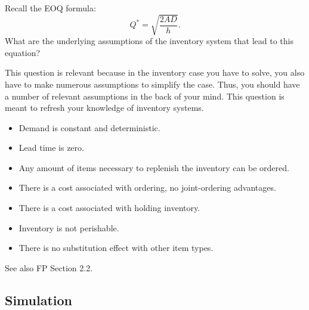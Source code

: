 \begin{exercise}\label{ex:1}
  Recall the EOQ formula:
  \begin{equation*}
    Q^* = \sqrt{\frac{ 2 A D}{h}}.
  \end{equation*}
What are the underlying assumptions of the inventory system that lead to this equation?

This question is relevant because in the inventory case you have to
solve, you also have to make numerous assumptions to simplify the
case. Thus, you should have a number of relevant assumptions in the
back of your mind.  This question is meant to refresh your knowledge
of inventory systems.


\begin{solution}
\begin{itemize}
\item Demand is constant and deterministic.
\item Lead time is zero.
\item Any amount of items necessary to replenish the inventory can be
  ordered.
\item There is a cost associated with ordering, no joint-ordering advantages.
\item There is a cost associated with holding inventory.
\item Inventory is not perishable.
\item There is no substitution effect with other item types.
\end{itemize}
See also FP Section 2.2.
\end{solution}
\end{exercise}

\subsection{Simulation}
\label{sec:simulation}



